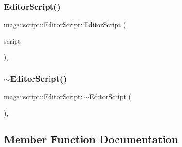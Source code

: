 \hypertarget{classmage_1_1script_1_1_editor_script_ac7db9f4ad73fc58c371aaf754009404e}{}\label{classmage_1_1script_1_1_editor_script_ac7db9f4ad73fc58c371aaf754009404e} 
\subsubsection{\texorpdfstring{Editor\+Script()}{EditorScript()}\hspace{0.1cm}{\footnotesize\ttfamily [3/3]}}
{\footnotesize\ttfamily mage\+::script\+::\+Editor\+Script\+::\+Editor\+Script (\begin{DoxyParamCaption}\item[{\hyperlink{classmage_1_1script_1_1_editor_script}{Editor\+Script} \&\&}]{script }\end{DoxyParamCaption})\hspace{0.3cm}{\ttfamily [default]}, {\ttfamily [noexcept]}}

\hypertarget{classmage_1_1script_1_1_editor_script_a1454bd68e4111691b6e287966dfd252a}{}\label{classmage_1_1script_1_1_editor_script_a1454bd68e4111691b6e287966dfd252a} 
\subsubsection{\texorpdfstring{$\sim$\+Editor\+Script()}{~EditorScript()}}
{\footnotesize\ttfamily mage\+::script\+::\+Editor\+Script\+::$\sim$\+Editor\+Script (\begin{DoxyParamCaption}{ }\end{DoxyParamCaption})\hspace{0.3cm}{\ttfamily [virtual]}, {\ttfamily [default]}}



\subsection{Member Function Documentation}
\hypertarget{classmage_1_1script_1_1_editor_script_af0804c603852f556d362f43e69240b2d}{}\label{classmage_1_1script_1_1_editor_script_af0804c603852f556d362f43e69240b2d} 
